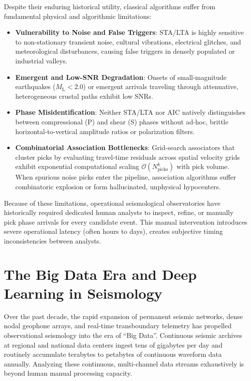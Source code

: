 Despite their enduring historical utility, classical algorithms suffer from
fundamental physical and algorithmic limitations:
\begin{itemize}
  \item \textbf{Vulnerability to Noise and False Triggers}: \ac{STA/LTA} is
    highly sensitive to non-stationary transient noise, cultural vibrations,
    electrical glitches, and meteorological disturbances, causing false
    triggers in densely populated or industrial valleys.
  \item \textbf{Emergent and Low-SNR Degradation}: Onsets of small-magnitude
    earthquakes ($M_{\mathrm{L}} < \num{2.0}$) or emergent arrivals traveling
    through attenuative, heterogeneous crustal paths exhibit low \acp{SNR}.
  \item \textbf{Phase Misidentification}: Neither \ac{STA/LTA} nor \ac{AIC}
    natively distinguishes between compressional (P) and shear (S)
    phases without ad-hoc, brittle horizontal-to-vertical amplitude
    ratios or polarization filters.
  \item \textbf{Combinatorial Association Bottlenecks}: Grid-search associators
    that cluster picks by evaluating travel-time residuals across spatial
    velocity grids exhibit exponential computational scaling
    $\mathcal{O}(N_{\mathrm{picks}}^k)$ with pick volume. When spurious noise
    picks enter the pipeline, association algorithms suffer combinatoric
    explosion or form hallucinated, unphysical hypocenters.
\end{itemize}

Because of these limitations, operational seismological observatories have
historically required dedicated human analysts to inspect, refine, or manually
pick phase arrivals for every candidate event. This manual intervention
introduces severe operational latency (often hours to days), creates subjective
timing inconsistencies between analysts.

\section{The Big Data Era and Deep Learning in Seismology}
\label{sec:dl_seismology}

Over the past decade, the rapid expansion of permanent seismic networks, dense
nodal geophone arrays, and real-time transboundary telemetry has propelled
observational seismology into the era of ``Big Data''. Continuous seismic
archives at regional and national data centers ingest tens of gigabytes per day
and routinely accumulate terabytes to petabytes of continuous waveform data
annually. Analyzing these continuous, multi-channel data streams exhaustively
is beyond human manual processing capacity.

